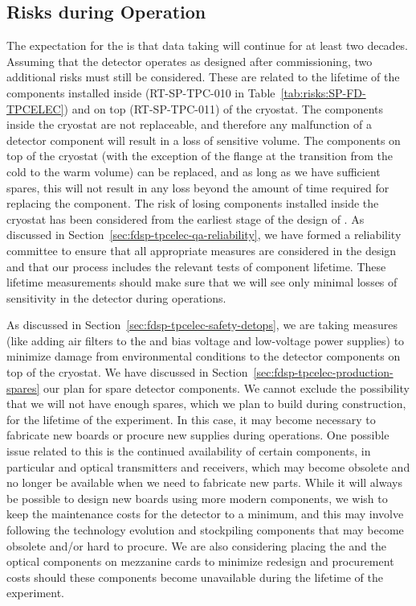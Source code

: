 \subsection{Risks during Operation}
\label{sec:fdsp-tpcelec-risks-operations}

The expectation for the   is that data taking will continue
for at least two decades. Assuming that the detector operates as designed after commissioning,
two additional risks must still be considered.
These are related to the lifetime of the  components
installed inside (RT-SP-TPC-010 in Table~\ref{tab:risks:SP-FD-TPCELEC}) and on top (RT-SP-TPC-011)
of the cryostat. The components inside the cryostat are not replaceable,
and therefore any malfunction of a detector component will result in
a loss of sensitive volume. The components on top of the cryostat
(with the exception of the flange at the transition from the cold to
the warm volume) can be replaced, and as long as we have sufficient
spares, this will not result in any loss beyond the amount 
of time required for replacing the component. The risk of losing components installed inside the cryostat has been considered
from the earliest stage of the design of . As discussed
in Section~\ref{sec:fdsp-tpcelec-qa-reliability}, we have formed a 
reliability committee to ensure that all appropriate measures
are considered in the design and that our  process includes
the relevant tests of component lifetime. These lifetime measurements
should make sure that we will see only minimal losses of sensitivity in the 
detector during operations. 

As discussed in Section~\ref{sec:fdsp-tpcelec-safety-detops}, we
are taking measures (like adding air filters to the
 and bias voltage and low-voltage power supplies) to
minimize damage from environmental conditions to the 
detector components on top of the cryostat. We have discussed in
Section~\ref{sec:fdsp-tpcelec-production-spares} our plan for 
spare detector components. We cannot exclude the possibility that we will not have enough
spares, which we plan to build during construction, for the lifetime of the experiment. In this
case, it may become necessary to fabricate new boards or procure new
supplies during operations. One possible issue related to this is the 
continued availability of certain components, in particular
 and optical transmitters and receivers, which may 
become obsolete and no longer be available when we need to fabricate new
parts. While it will always be 
possible to design new boards using more modern components, we
wish to keep the maintenance costs for the detector to a minimum,
and this may involve following the technology evolution and stockpiling components that may become obsolete
and/or hard to procure. We are also considering placing the
 and the optical components on mezzanine cards
to minimize redesign and procurement costs should these 
components become unavailable during the lifetime of the experiment.
